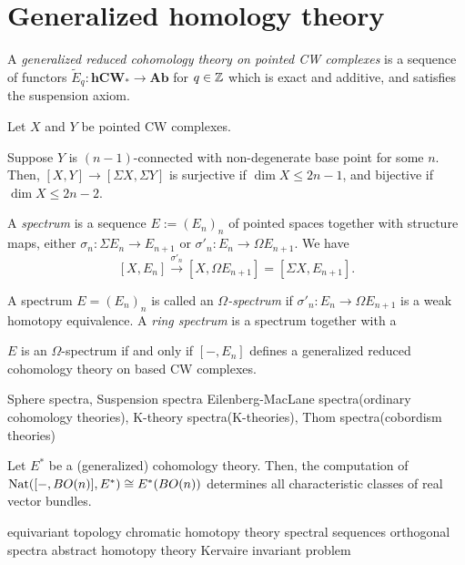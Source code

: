 \documentclass{../../large}
\begin{document}
\section{Generalized homology theory}

A \emph{generalized reduced cohomology theory on pointed CW complexes} is a sequence of functors $\tilde E_q:\mathbf{hCW}_*\to\mathbf{Ab}$ for $q\in\mathbb{Z}$ which is exact and additive, and satisfies the suspension axiom.

\begin{prb}
Let $X$ and $Y$ be pointed CW complexes.
\begin{parts}
\item Suppose $Y$ is $(n-1)$-connected with non-degenerate base point for some $n$. Then, $[X,Y]\to[\Sigma X,\Sigma Y]$ is surjective if $\dim X\le 2n-1$, and bijective if $\dim X\le2n-2$.
\end{parts}
\end{prb}


\begin{prb}
A \emph{spectrum} is a sequence $E:=(E_n)_n$ of pointed spaces together with structure maps, either $\sigma_n:\Sigma E_n\to E_{n+1}$ or $\sigma'_n:E_n\to\Omega E_{n+1}$.
We have
\[[X,E_n]\xrightarrow{\sigma'_n}[X,\Omega E_{n+1}]=[\Sigma X,E_{n+1}].\]
\end{prb}

\begin{prb}
A spectrum $E=(E_n)_n$ is called an \emph{$\Omega$-spectrum} if $\sigma'_n:E_n\to\Omega E_{n+1}$ is a weak homotopy equivalence.
A \emph{ring spectrum} is a spectrum together with a 
\begin{parts}
\item $E$ is an $\Omega$-spectrum if and only if $[-,E_n]$ defines a generalized reduced cohomology theory on based CW complexes.
\end{parts}
\end{prb}


Sphere spectra, Suspension spectra
Eilenberg-MacLane spectra(ordinary cohomology theories), K-theory spectra(K-theories), Thom spectra(cobordism theories)



Let $E^*$ be a (generalized) cohomology theory.
Then, the computation of $\operatorname{Nat}([-,BO(n)],E^*)\cong E^*(BO(n))$ determines all characteristic classes of real vector bundles.




equivariant topology
chromatic homotopy theory
spectral sequences
orthogonal spectra
abstract homotopy theory
Kervaire invariant problem
\end{document}
